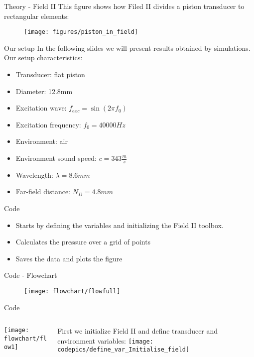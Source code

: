 \documentclass{beamer}
\begin{document}
\begin{frame}{Theory - Field II}
This figure shows how Filed II divides a piston transducer to rectangular elements:
\begin{figure}
\texttt{[image: figures/piston\_in\_field]}
\end{figure}
\end{frame}

\begin{frame}{Our setup}
In the following slides we will present results obtained by simulations.
Our setup characteristics:
\begin{itemize}
	\item Transducer: flat piston
	\item Diameter: 12.8mm
	\item Excitation wave: $f_{exc}=\sin(2\pi f_0)$
	\item Excitation frequency: $f_0=40000Hz$
	\item Environment: air
	\item Environment sound speed: $c=343\frac{m}{s}$ 
	\item Wavelength: $\lambda = 8.6mm$
	\item Far-field distance: $N_D=4.8mm$ 
\end{itemize}
\end{frame}

\begin{frame}{Code}
\begin{itemize}
\item Starts by defining the variables and initializing the Field II toolbox.
\item Calculates the pressure over a grid of points
\item Saves the data and plots the figure
\end{itemize}

\end{frame}

\begin{frame}{Code - Flowchart}
\begin{figure}[\centering]
\texttt{[image: flowchart/flowfull]}
\end{figure}
\end{frame}

\begin{frame}{Code}
\begin{columns}[T] %
\begin{column}[]{.05\textwidth}
\texttt{[image: flowchart/flow1]}
\end{column}%
\hfill%
\begin{column}{.8\textwidth}
\small{First we initialize Field II and define transducer and environment variables:}
\newline
\newline
\texttt{[image: codepics/define\_var\_Initialise\_field]}
\end{column}%
\end{columns}
\end{frame}
\end{document}

